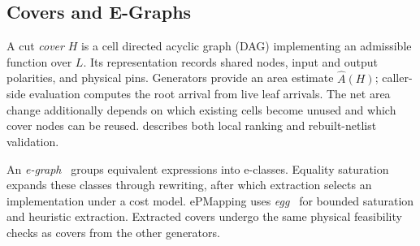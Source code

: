 \subsection{Covers and E-Graphs}
A cut \emph{cover} $H$ is a cell directed acyclic graph (DAG) implementing an admissible function over $L$. Its representation records shared nodes, input and output polarities, and physical pins. Generators provide an area estimate $\widehat A(H)$; caller-side evaluation computes the root arrival from live leaf arrivals. The net area change additionally depends on which existing cells become unused and which cover nodes can be reused.  describes both local ranking and rebuilt-netlist validation.

An \emph{e-graph}~\cite{nelson1980egraph} groups equivalent expressions into e-classes. Equality saturation~\cite{tate2009equality} expands these classes through rewriting, after which extraction selects an implementation under a cost model. ePMapping uses \textit{egg}~\cite{willsey2021egg} for bounded saturation and heuristic extraction. Extracted covers undergo the same physical feasibility checks as covers from the other generators.
